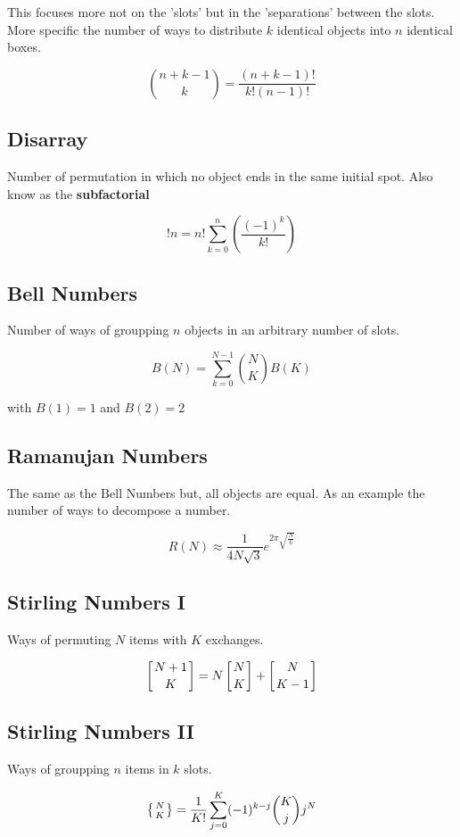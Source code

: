 This focuses more not on the 'slots' but in the 'separations' between the slots.
More specific the number of ways to distribute \(k\) identical objects into \(n\) identical boxes. 

\[\binom{n + k - 1}{k} = \frac{(n + k - 1)!}{k!(n - 1)!}\]

\subsection{Disarray}

Number of permutation in which no object ends in the same initial spot. Also know as the \textbf{subfactorial}

\[!n = n! \sum_{k = 0}^{n} \left(\frac{(-1)^k}{k!}\right)\]

\subsection{Bell Numbers}

Number of ways of groupping \(n\) objects in an arbitrary number of slots.

\[B(N) = \sum_{k = 0}^{N-1}\binom{N}{K}B(K)\]

with \(B(1) = 1\) and \(B(2) = 2\)

\subsection{Ramanujan Numbers}

The same as the Bell Numbers but, all objects are equal. As an example the number of ways
to decompose a number.

\[R(N) \approx \frac{1}{4N\sqrt{3}} e^{2\pi \sqrt{\frac{N}{6}}}\]

\subsection{Stirling Numbers I}

Ways of permuting \(N\) items with \(K\) exchanges.

\[ \left[ N + 1 \atop K\right] = N\left[N \atop K\right] + \left[N \atop K - 1\right]\] 

\subsection{Stirling Numbers II}

Ways of groupping \(n\) items in \(k\) slots.

\[ \left\{ \begin{matrix} N \atop K \end{matrix}\right\} = \frac{1}{K!} \sum_{j=0}^{K}(-1)^{k - j}\binom{K}{j}j^N \]

